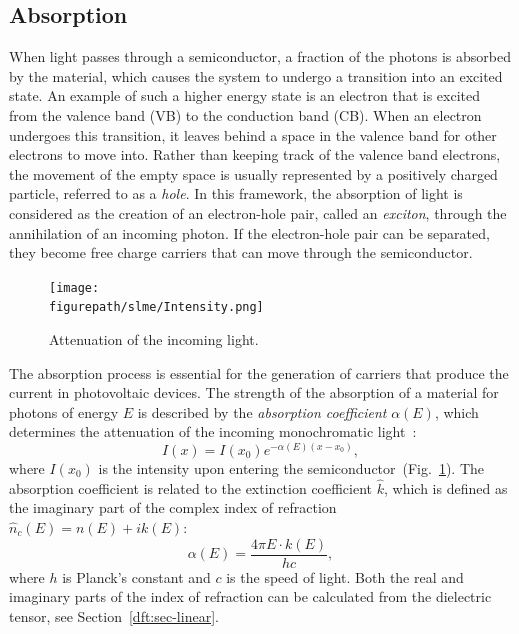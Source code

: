\begin{refsection}
\subsection{Absorption}\label{slme:sec-absorption} 
 
When light passes through a semiconductor, a fraction of the photons is 
absorbed by the material, which causes the system to undergo a transition into 
an excited state. An example of such a higher energy state is an electron that 
is excited from the valence band (VB) to the conduction band (CB). When an 
electron undergoes this transition, it leaves behind a space in the valence 
band for other electrons to move into. Rather than keeping track of the 
valence band electrons, the movement of the empty space is usually represented 
by a positively charged particle, referred to as a \textit{hole}. In this 
framework, the absorption of light is considered as the creation of an 
electron-hole pair, called an \textit{exciton}, through the annihilation of an 
incoming photon. If the electron-hole pair can be separated, they become 
free charge carriers that can move through the semiconductor. 
 
\begin{figure}
\centering 
\captionsetup{width=0.35\textwidth} 
\texttt{[image: \\figurepath/slme/Intensity.png]} 
\caption{\label{slme:fig-intensity} Attenuation of the incoming light.} 
\end{figure} 
 
The absorption process is essential for the generation of carriers that 
produce the current in photovoltaic devices. The strength of the absorption of 
a material for photons of energy $E$ is described by the \textit{absorption 
coefficient} $\alpha(E)$, which determines the attenuation of the incoming 
monochromatic light~\cite{Green1981}: 
\begin{equation}\label{slme:eq-intensity} 
I(x) = I(x_0)e^{-\alpha(E) (x - x_0)}, 
\end{equation} 
where $I(x_0)$ is the intensity upon entering the 
semiconductor~(Fig.~\ref{slme:fig-intensity}). The absorption coefficient is 
related to the extinction coefficient $\hat{k}$, which is defined as the 
imaginary part of the complex index of refraction $\hat{n}_c(E)=n(E)+ik(E)$: 
\begin{equation}\label{slme:eq-absorption} 
\alpha (E)= \frac{4 \pi E \cdot k(E)}{h c}, 
\end{equation} 
where $h$ is Planck's constant and $c$ is the speed of light. Both the real 
and imaginary parts of the index of refraction can be calculated from the 
dielectric tensor, see Section~\ref{dft:sec-linear}. 
 

\end{refsection}
